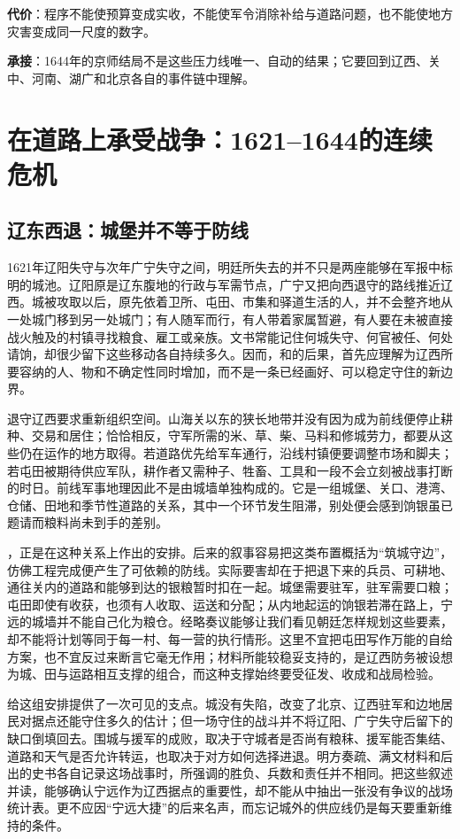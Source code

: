 \textbf{代价}：程序不能使预算变成实收，不能使军令消除补给与道路问题，也不能使地方灾害变成同一尺度的数字。

\textbf{承接}：1644年的京师结局不是这些压力线唯一、自动的结果；它要回到辽西、关中、河南、湖广和北京各自的事件链中理解。

\section{在道路上承受战争：1621--1644的连续危机}

\subsection{辽东西退：城堡并不等于防线}

1621年辽阳失守与次年广宁失守之间，明廷所失去的并不只是两座能够在军报中标明的城池。辽阳原是辽东腹地的行政与军需节点，广宁又把向西退守的路线推近辽西。城被攻取以后，原先依着卫所、屯田、市集和驿道生活的人，并不会整齐地从一处城门移到另一处城门；有人随军而行，有人带着家属暂避，有人要在未被直接战火触及的村镇寻找粮食、雇工或亲族。文书常能记住何城失守、何官被任、何处请饷，却很少留下这些移动各自持续多久。因而，和的后果，首先应理解为辽西所要容纳的人、物和不确定性同时增加，而不是一条已经画好、可以稳定守住的新边界。

退守辽西要求重新组织空间。山海关以东的狭长地带并没有因为成为前线便停止耕种、交易和居住；恰恰相反，守军所需的米、草、柴、马料和修城劳力，都要从这些仍在运作的地方取得。若道路优先给军车通行，沿线村镇便要调整市场和脚夫；若屯田被期待供应军队，耕作者又需种子、牲畜、工具和一段不会立刻被战事打断的时日。前线军事地理因此不是由城墙单独构成的。它是一组城堡、关口、港湾、仓储、田地和季节性道路的关系，其中一个环节发生阻滞，别处便会感到饷银虽已题请而粮料尚未到手的差别。

，正是在这种关系上作出的安排。后来的叙事容易把这类布置概括为“筑城守边”，仿佛工程完成便产生了可依赖的防线。实际要害却在于把退下来的兵员、可耕地、通往关内的道路和能够到达的银粮暂时扣在一起。城堡需要驻军，驻军需要口粮；屯田即使有收获，也须有人收取、运送和分配；从内地起运的饷银若滞在路上，宁远的城墙并不能自己化为粮仓。经略奏议能够让我们看见朝廷怎样规划这些要素，却不能将计划等同于每一村、每一营的执行情形。这里不宜把屯田写作万能的自给方案，也不宜反过来断言它毫无作用；材料所能较稳妥支持的，是辽西防务被设想为城、田与运路相互支撑的组合，而这种支撑始终要受征发、收成和战局检验。

给这组安排提供了一次可见的支点。城没有失陷，改变了北京、辽西驻军和边地居民对据点还能守住多久的估计；但一场守住的战斗并不将辽阳、广宁失守后留下的缺口倒填回去。围城与援军的成败，取决于守城者是否尚有粮秣、援军能否集结、道路和天气是否允许转运，也取决于对方如何选择进退。明方奏疏、满文材料和后出的史书各自记录这场战事时，所强调的胜负、兵数和责任并不相同。把这些叙述并读，能够确认宁远作为辽西据点的重要性，却不能从中抽出一张没有争议的战场统计表。更不应因“宁远大捷”的后来名声，而忘记城外的供应线仍是每天要重新维持的条件。


